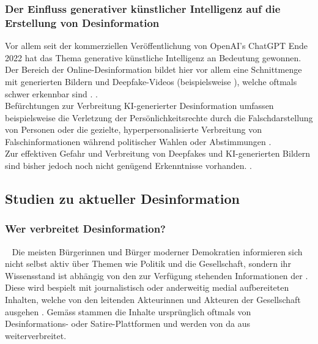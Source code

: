 \documentclass[12pt,a4paper]{article}        %
\begin{document}
\subsubsection{Der Einfluss generativer künstlicher Intelligenz auf die Erstellung von Desinformation}
Vor allem seit der kommerziellen Veröffentlichung von OpenAI’s ChatGPT Ende 2022 hat das Thema generative künstliche Intelligenz an Bedeutung gewonnen. Der Bereich der Online-Desinformation bildet hier vor allem eine Schnittmenge mit generierten Bildern und Deepfake-Videos (beispielsweise  \parencite[5]{birrer_what_2024}), welche oftmals schwer erkennbar sind \parencites[7]{montasari_artificial_2022}.  \parencite[4]{bontridder_role_2021}. \\
Befürchtungen zur Verbreitung KI-generierter Desinformation umfassen beispielsweise die Verletzung der Persönlichkeitsrechte durch die Falschdarstellung von Personen oder die gezielte, hyperpersonalisierte Verbreitung von Falschinformationen während politischer Wahlen oder Abstimmungen \parencite[56, 64f]{kertysova_artificial_2018}.\\
Zur effektiven Gefahr und Verbreitung von Deepfakes und KI-generierten Bildern sind bisher jedoch noch nicht genügend Erkenntnisse vorhanden. \parencite{birrer_what_2024}.

\subsection{Studien zu aktueller Desinformation}
\subsubsection{Wer verbreitet Desinformation?}
~\label{theory_disseminents}
Die meisten Bürgerinnen und Bürger moderner Demokratien informieren sich nicht selbst aktiv über Themen wie Politik und die Gesellschaft, sondern ihr Wissensstand ist abhängig von den zur Verfügung stehenden Informationen der . Diese wird bespielt mit journalistisch oder anderweitig medial aufbereiteten Inhalten, welche von den leitenden Akteurinnen und Akteuren der Gesellschaft ausgehen \parencite[69]{lecheler_disinformation_2022}. Gemäss \textcite[217]{allcott_social_2017} stammen die Inhalte ursprünglich oftmals von Desinformations- oder Satire-Plattformen und werden von da aus weiterverbreitet.
\end{document}
